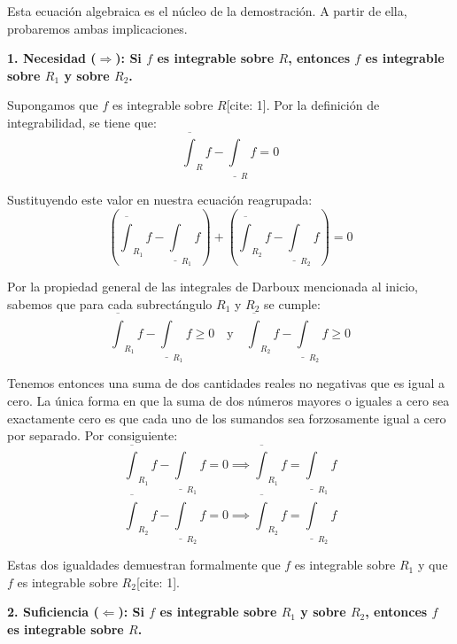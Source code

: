 \documentclass[11pt,letterpaper]{article}
\begin{document}
Esta ecuación algebraica es el núcleo de la demostración. A partir de ella, probaremos ambas implicaciones.

\vspace{0.5cm}
\textbf{1. Necesidad ($\Rightarrow$): Si $f$ es integrable sobre $R$, entonces $f$ es integrable sobre $R_{1}$ y sobre $R_{2}$.}

Supongamos que $f$ es integrable sobre $R$[cite: 1]. Por la definición de integrabilidad, se tiene que:
\begin{equation*}
\overline{\int}_{R}f - \underline{\int}_{R}f = 0
\end{equation*}

Sustituyendo este valor en nuestra ecuación reagrupada:
\begin{equation*}
\left(\overline{\int}_{R_{1}}f - \underline{\int}_{R_{1}}f\right) + \left(\overline{\int}_{R_{2}}f - \underline{\int}_{R_{2}}f\right) = 0
\end{equation*}

Por la propiedad general de las integrales de Darboux mencionada al inicio, sabemos que para cada subrectángulo $R_{1}$ y $R_{2}$ se cumple:
\begin{equation*}
\overline{\int}_{R_{1}}f - \underline{\int}_{R_{1}}f \ge 0 \quad \text{y} \quad \overline{\int}_{R_{2}}f - \underline{\int}_{R_{2}}f \ge 0
\end{equation*}

Tenemos entonces una suma de dos cantidades reales no negativas que es igual a cero. La única forma en que la suma de dos números mayores o iguales a cero sea exactamente cero es que cada uno de los sumandos sea forzosamente igual a cero por separado. Por consiguiente:
\begin{equation*}
\overline{\int}_{R_{1}}f - \underline{\int}_{R_{1}}f = 0 \implies \overline{\int}_{R_{1}}f = \underline{\int}_{R_{1}}f
\end{equation*}
\begin{equation*}
\overline{\int}_{R_{2}}f - \underline{\int}_{R_{2}}f = 0 \implies \overline{\int}_{R_{2}}f = \underline{\int}_{R_{2}}f
\end{equation*}

Estas dos igualdades demuestran formalmente que $f$ es integrable sobre $R_{1}$ y que $f$ es integrable sobre $R_{2}$[cite: 1].

\vspace{0.5cm}
\textbf{2. Suficiencia ($\Leftarrow$): Si $f$ es integrable sobre $R_{1}$ y sobre $R_{2}$, entonces $f$ es integrable sobre $R$.}
\end{document}
